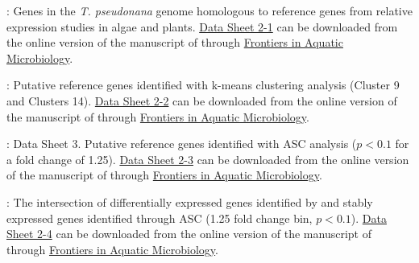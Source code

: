     \begin{DS2}
    
    \item \label{DS21}: Genes in the \textit{T. pseudonana} genome homologous to reference genes from relative expression studies in algae and plants. \href{http://journal.frontiersin.org/file/downloadfile/16019/octet-stream/Data\%20Sheet\%201.XLS/313/2/31186}{Data Sheet 2-1} can be downloaded from the online version of the manuscript of \citet{Alexander2012} through \href{http://dx.doi.org/10.3389/fmicb.2012.00385}{Frontiers in Aquatic Microbiology}. 
    \item \label{DS22}: Putative reference genes identified with k-means clustering analysis (Cluster 9 and Clusters 14). \href{http://journal.frontiersin.org/file/downloadfile/16022/octet-stream/Data\%20Sheet\%202.XLS/313/1/31186}{Data Sheet 2-2} can be downloaded from the online version of the manuscript of \citet{Alexander2012} through \href{http://dx.doi.org/10.3389/fmicb.2012.00385}{Frontiers in Aquatic Microbiology}. 
        \item \label{DS23}: Data Sheet 3. Putative reference genes identified with ASC analysis ($p < 0.1$ for a fold change of 1.25). \href{http://journal.frontiersin.org/file/downloadfile/16025/octet-stream/Data\%20Sheet\%203.XLS/313/1/31186}{Data Sheet 2-3} can be downloaded from the online version of the manuscript of \citet{Alexander2012} through \href{http://dx.doi.org/10.3389/fmicb.2012.00385}{Frontiers in Aquatic Microbiology}. 

            \item \label{DS24}: The intersection of differentially expressed genes identified by \citet{Mock2008} and stably expressed genes identified through ASC (1.25 fold change bin, $p < 0.1$). \href{http://journal.frontiersin.org/file/downloadfile/16028/octet-stream/Data\%20Sheet\%204.XLS/313/1/31186}{Data Sheet 2-4} can be downloaded from the online version of the manuscript of \citet{Alexander2012} through \href{http://dx.doi.org/10.3389/fmicb.2012.00385}{Frontiers in Aquatic Microbiology}. 

    \end{DS2}


\newpage





